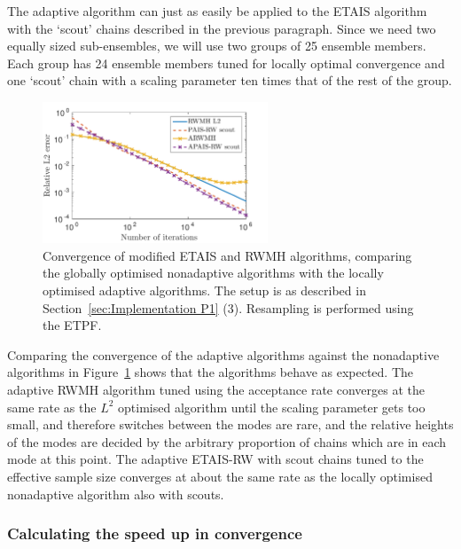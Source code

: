 \documentclass[final]{siamltex}
\begin{document}
The adaptive algorithm can just as easily be applied to the ETAIS
algorithm with the `scout' chains described in the previous paragraph.
Since we need two equally sized sub-ensembles, we will use two groups
of 25 ensemble members. Each group has 24 ensemble members tuned for
locally optimal convergence and one `scout' chain with a scaling
parameter ten times that of the rest of the group.

\begin{figure}[htb]
\begin{center}
\includegraphics[width=0.6\textwidth]{"figures/BM2_AL2"}
\caption{Convergence of modified ETAIS and RWMH algorithms, comparing
the globally optimised nonadaptive algorithms with the locally
optimised adaptive algorithms. The setup is as described in
Section~\ref{sec:Implementation P1} (3). Resampling is performed using
the ETPF.}
\label{fig:BM2_AL2}
\end{center}
\end{figure}

Comparing the convergence of the adaptive algorithms against the
nonadaptive algorithms in Figure~\ref{fig:BM2_AL2} shows that the
algorithms behave as expected. The adaptive RWMH algorithm tuned using
the acceptance rate converges at the same rate as the $L^2$ optimised
algorithm until the scaling parameter gets too small, and therefore
switches between the modes are rare, and the relative heights of the
modes are decided by the arbitrary proportion of chains which are in
each mode at this point. The adaptive ETAIS-RW with scout chains tuned
to the effective sample size converges at about the same rate as the
locally optimised nonadaptive algorithm also with scouts.


\subsubsection{Calculating the speed up in convergence}
\label{sec:calc_saving}
\end{document}
